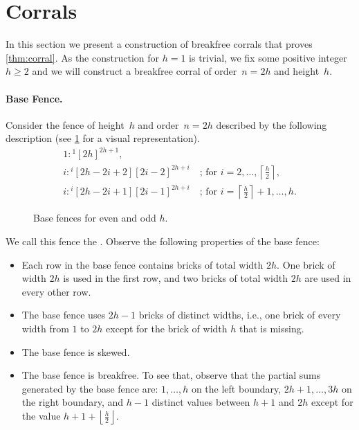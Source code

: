 \documentclass[runningheads,envcountsame]{llncs}
\newcommand{\floor}[1]{\left\lfloor #1 \right\rfloor}
\newcommand{\ceil}[1]{\left\lceil #1 \right\rceil}
\let\ge\geqslant
\begin{document}
\section{Corrals}\label{sec:corral}
In this section we present a construction of breakfree corrals that proves \cref{thm:corral}.
As the construction for $h=1$ is trivial, we fix some positive integer $h \ge 2$ and we will construct a breakfree corral of order~$n=2h$ and height~$h$.

\paragraph{Base Fence.}
Consider the fence of height~$h$ and order~$n=2h$ described by the following description (see \cref{fig:corral_base_fence} for a visual representation).
\begin{gather*}
    1:{}^1[2h]^{2h+1}\text{,}\\
    i:{}^i[2h-2i+2][2i-2]^{2h+i}\quad\text{; for } i=2,\ldots,\ceil{\frac{h}{2}}\text{,}\\
    i:{}^i[2h-2i+1][2i-1]^{2h+i}\quad\text{; for } i=\ceil{\frac{h}{2}}+1,\ldots,h\text{.}
\end{gather*}
\begin{figure}[ht]
    \centering
    \subfloat[The base fence for $h=8$.\label{fig:corral_base_fence_even}]{%
        \begin{tikzpicture}[compact brick diagram, inner xsep=0.5pt]
            
        \end{tikzpicture}%
    }\hfill
    \subfloat[The base fence for $h=7$.\label{fig:corral_base_fence_odd}]{%
        \begin{tikzpicture}[compact brick diagram, inner xsep=0.5pt]
            
        \end{tikzpicture}%
    }
    \caption{Base fences for even and odd $h$.}
    \label{fig:corral_base_fence}
\end{figure}

We call this fence the .
Observe the following properties of the base fence:
\begin{itemize}
    \item Each row in the base fence contains bricks of total width \(2h\).
    One brick of width \(2h\) is used in the first row, and two bricks of total width $2h$ are used in every other row.
    \item The base fence uses $2h-1$ bricks of distinct widths, i.e., one brick of every width from $1$ to $2h$ except for the brick of width $h$ that is missing.
    \item The base fence is skewed.
    \item The base fence is breakfree. To see that, observe that the partial sums generated by the base fence are: $1,\ldots,h$ on the left boundary, $2h+1,\ldots,3h$ on the right boundary, and $h-1$ distinct values between $h+1$ and $2h$ except for the value $h+1+\floor{\frac{h}{2}}$.
\end{itemize}
\end{document}

